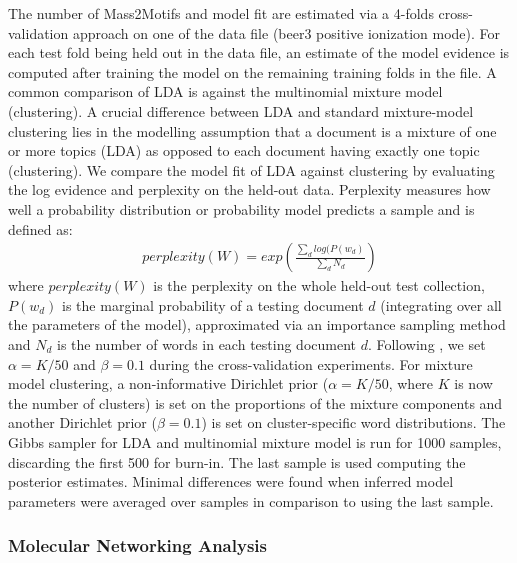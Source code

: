 The number of Mass2Motifs and model fit are estimated via a 4-folds cross-validation approach on one of the data file (beer3 positive ionization mode). For each test fold being held out in the data file, an estimate of the model evidence is computed after training the model on the remaining training folds in the file. A common comparison of LDA is against the multinomial mixture model (clustering). A crucial difference between LDA and standard mixture-model clustering lies in the modelling assumption that a document is a mixture of one or more topics (LDA) as opposed to each document having exactly one topic (clustering). We compare the model fit of LDA against clustering by evaluating the log evidence and perplexity on the held-out data. Perplexity measures how well a probability distribution or probability model predicts a sample and is defined as:
\begin{align*}
perplexity(W)=exp\left(\frac{\sum_{d}log(P(w_{d})}{\sum_{d}N_d}\right)
\end{align*}
where $perplexity(W)$ is the perplexity on the whole held-out test collection, $P(w_d)$ is the marginal probability of a testing document $d$ (integrating over all the parameters of the model), approximated via an importance sampling method \cite{wallach2009evaluation} and $N_d$ is the number of words in each testing document $d$. Following \cite{Griffiths2004}, we set $\alpha=K/50$ and $\beta=0.1$ during the cross-validation experiments. For mixture model clustering, a non-informative Dirichlet prior ($\alpha=K/50$, where $K$ is now the number of clusters) is set on the proportions of the mixture components and another Dirichlet prior ($\beta=0.1$) is set on cluster-specific word distributions. The Gibbs sampler for LDA and multinomial mixture model is run for 1000 samples, discarding the first 500 for burn-in. The last sample is used computing the posterior estimates. Minimal differences were found when inferred model parameters were averaged over samples in comparison to using the last sample.

\subsubsection{Molecular Networking Analysis}

